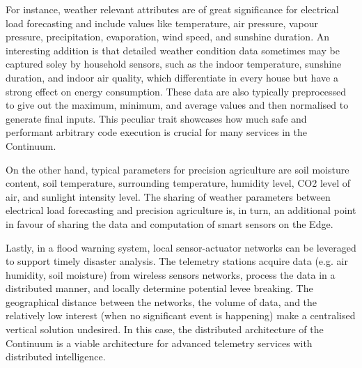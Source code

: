 For instance, weather relevant attributes are of great significance for electrical load forecasting and include values like temperature, air pressure, vapour pressure, precipitation, evaporation, wind speed, and sunshine duration. An interesting addition is that detailed weather condition data sometimes may be captured soley by household sensors, such as the indoor temperature, sunshine duration, and indoor air quality, which differentiate in every house but have a strong effect on energy consumption. These data are also typically preprocessed to give out the maximum, minimum, and average values and then normalised to generate final inputs. This peculiar trait showcases how much safe and performant arbitrary code execution is crucial for many services in the Continuum.

On the other hand, typical parameters for precision agriculture are soil moisture content, soil temperature, surrounding temperature, humidity level, CO2 level of air, and sunlight intensity level. The sharing of weather parameters between electrical load forecasting and precision agriculture is, in turn, an additional point in favour of sharing the data and computation of smart sensors on the Edge.

Lastly, in a flood warning system, local sensor-actuator networks can be leveraged to support timely disaster analysis. The telemetry stations acquire data (e.g. air humidity, soil moisture) from wireless sensors networks, process the data in a distributed manner, and locally determine potential levee breaking. The geographical distance between the networks, the volume of data, and the relatively low interest (when no significant event is happening) make a centralised vertical solution undesired. In this case, the distributed architecture of the Continuum is a viable architecture for advanced telemetry services with distributed intelligence.

